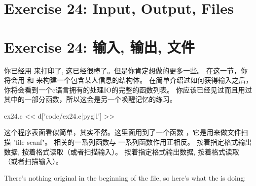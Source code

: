 \chapter{Exercise 24: Input, Output, Files}
\chapter{Exercise 24: 输入, 输出, 文件}

你已经用  来打印了, 这已经很棒了。但是你肯定想做的更多一些。 
在这一节，你将会用  和  来构建一个包含某人信息的结构体。
在简单介绍过如何获得输入之后，你将会看到一个c语言拥有的处理IO的完整的函数列表。
你应该已经见过而且用过其中的一部分函数，所以这会是另一个唤醒记忆的练习。

\begin{code}{ex24.c}
<< d['code/ex24.c|pyg|l'] >>
\end{code}

这个程序表面看似简单，其实不然。这里面用到了一个函数 ，它是用来做文件扫描 "file scanf"。
  相关的一系列函数与  一系列函数作用正相反。 
 按着指定格式输出数据,  按着格式读取（或者扫描输入）。
  按着指定格式输出数据,  按着格式读取（或者扫描输入）。

There's nothing original in the beginning of the file, so here's what
the  is doing:

